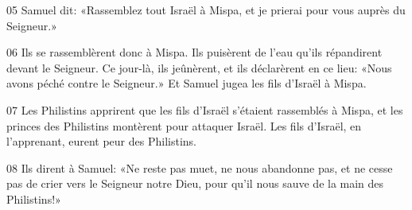 
05 Samuel dit: «Rassemblez tout Israël à Mispa, et je prierai pour vous auprès du Seigneur.»

06 Ils se rassemblèrent donc à Mispa. Ils puisèrent de l’eau qu’ils répandirent devant le Seigneur. Ce jour-là, ils jeûnèrent, et ils déclarèrent en ce lieu: «Nous avons péché contre le Seigneur.» Et Samuel jugea les fils d’Israël à Mispa.

07 Les Philistins apprirent que les fils d’Israël s’étaient rassemblés à Mispa, et les princes des Philistins montèrent pour attaquer Israël. Les fils d’Israël, en l’apprenant, eurent peur des Philistins.

08 Ils dirent à Samuel: «Ne reste pas muet, ne nous abandonne pas, et ne cesse pas de crier vers le Seigneur notre Dieu, pour qu’il nous sauve de la main des Philistins!»